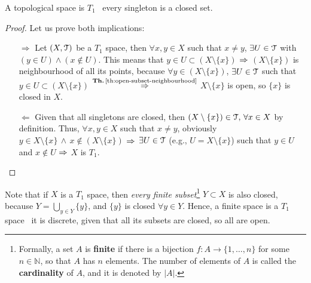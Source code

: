 \begin{theorem}
	\label{th:t1-closed-points}
	A topological space is $T_1$ \iff\ every singleton is a closed set.
\end{theorem}
\begin{proof}
	Let us prove both implications:
	\begin{itemize}
			\item[$\boxed{\Rightarrow}$] Let $(X,\EuScript{T})$ be a $T_1$ space, then $\forall x,y \in X$ such that $x\neq y$, $\exists U\in\EuScript{T}$ with $(y\in U)\land (x\notin U)$. This means that $y\in U\subset (X\setminus\{x\})$ $\Rightarrow$ $(X\setminus\{x\})$ is neighbourhood of all its points, because $\forall y\in (X\setminus\{x\})$, $\exists U\in \EuScript{T}$ such that $y\in U\subset (X\setminus\{x\})$ $\overset{\text{\thref{th:open-subset-neighbourhood}}}{\Then}$ $X\setminus\{x\}$ is open, so $\{x\}$ is closed in $X$.
		\item[$\boxed{\Leftarrow}$] Given that all singletons are closed,  then $(X\setminus\{x\})\in \EuScript{T},\,\forall x\in X$ by definition. Thus, $\forall x,y\in X$ such that $x\neq y$, obviously $y\in X\setminus\{x\}\,\land\,x\notin (X\setminus\{x\})$ $\Rightarrow$ $\exists U\in \EuScript{T}$ (e.g., $U=X\setminus\{x\}$) such that $y\in U$ and $x\notin U$ $\Rightarrow$ $X$ is $T_1$.
	\end{itemize}
\end{proof}

\begin{remark}
	Note that if $X$ is a $T_1$ space, then \emph{every finite subset}\footnote{Formally, a set $A$ is \textbf{finite} if there is a bijection $f:A\rightarrow\{1,\dots,n\}$ for some $n\in \mathbb{N}$, so that $A$ has $n$ elements. The number of elements of $A$ is called the \textbf{cardinality} of $A$, and it is denoted by $|A|$.} $Y\subset X$ is also closed, because $Y=\bigcup_{y\in Y}\{y\}$, and $\{y\}$ is closed $\forall y\in Y$.
	Hence, a finite space is a $T_1$ space \iff\ it is discrete, given that all its subsets are closed, so all are open.
\end{remark}

